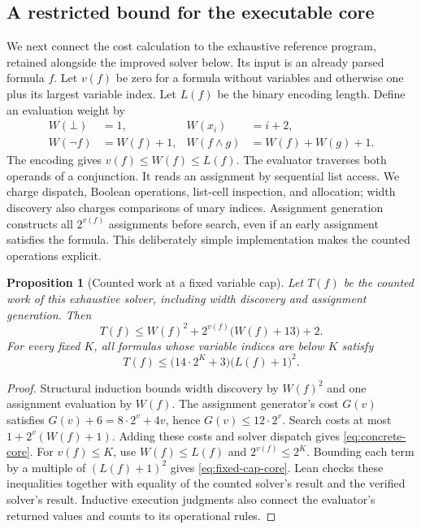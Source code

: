 \documentclass[11pt,a4paper]{article}
\numberwithin{equation}{section}
\theoremstyle{plain}
\newtheorem{proposition}[lemma]{Proposition}
\theoremstyle{definition}
\theoremstyle{remark}
\begin{document}
\subsection{A restricted bound for the executable core}
\label{sec:concrete-core}

We next connect the cost calculation to the exhaustive reference program, retained alongside the improved solver below. Its input is an already parsed formula $f$. Let $v(f)$ be zero for a formula without variables and otherwise one plus its largest variable index. Let $L(f)$ be the binary encoding length. Define an evaluation weight by
\begin{align}
W(\bot)&=1, & W(x_i)&=i+2, \\
W(\neg f)&=W(f)+1, & W(f\land g)&=W(f)+W(g)+1.
\end{align}
The encoding gives $v(f)\leq W(f)\leq L(f)$. The evaluator traverses both operands of a conjunction. It reads an assignment by sequential list access. We charge dispatch, Boolean operations, list-cell inspection, and allocation; width discovery also charges comparisons of unary indices. Assignment generation constructs all $2^{v(f)}$ assignments before search, even if an early assignment satisfies the formula. This deliberately simple implementation makes the counted operations explicit.

\begin{proposition}[Counted work at a fixed variable cap]
\label{prop:concrete-core}
Let $T(f)$ be the counted work of this exhaustive solver, including width discovery and assignment generation. Then
\begin{equation}
T(f)\leq W(f)^2+2^{v(f)}\bigl(W(f)+13\bigr)+2.
\label{eq:concrete-core}
\end{equation}
For every fixed $K$, all formulas whose variable indices are below $K$ satisfy
\begin{equation}
T(f)\leq \bigl(14\cdot2^K+3\bigr)\bigl(L(f)+1\bigr)^2.
\label{eq:fixed-cap-core}
\end{equation}
\end{proposition}

\begin{proof}
Structural induction bounds width discovery by $W(f)^2$ and one assignment evaluation by $W(f)$. The assignment generator's cost $G(v)$ satisfies
$G(v)+6=8\cdot2^v+4v$, hence $G(v)\leq12\cdot2^v$. Search costs at most $1+2^v(W(f)+1)$. Adding these costs and solver dispatch gives \eqref{eq:concrete-core}. For $v(f)\leq K$, use $W(f)\leq L(f)$ and $2^{v(f)}\leq2^K$. Bounding each term by a multiple of $(L(f)+1)^2$ gives \eqref{eq:fixed-cap-core}. Lean checks these inequalities together with equality of the counted solver's result and the verified solver's result. Inductive execution judgments also connect the evaluator's returned values and counts to its operational rules.
\end{proof}
\end{document}
